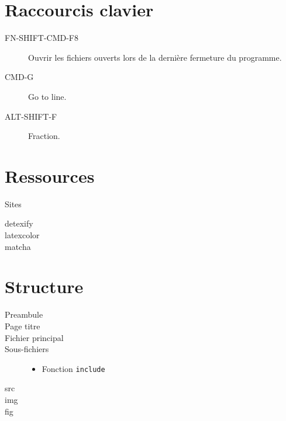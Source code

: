 \documentclass[10pt, french]{article}
\begin{document}
\begin{multicols*}{2} 

\section{Raccourcis clavier}
\begin{description}
	\item[FN-SHIFT-CMD-F8]	Ouvrir les fichiers ouverts lors de la dernière fermeture du programme.
	\item[CMD-G]	Go to line.
	\item[ALT-SHIFT-F]	Fraction.
\end{description}

\section*{Ressources}
\begin{rappel}{Sites}
\begin{description}
	\item[detexify]
	\item[latexcolor]
	\item[matcha]
\end{description}
\end{rappel}


\section*{Structure}
\begin{distributions}[Fichiers]
\begin{description}
	\item[Preambule]
	\item[Page titre]
	\item[Fichier principal]
	\item[Sous-fichiers]
		\begin{itemize}
		\item	Fonction \texttt{include}
		\end{itemize}
\end{description}
\end{distributions}

\begin{distributions}[Dossier]
\begin{description}
	\item[src]
	\item[img]
	\item[fig]
\end{description}
\end{distributions}


\end{multicols*}
\end{document}
